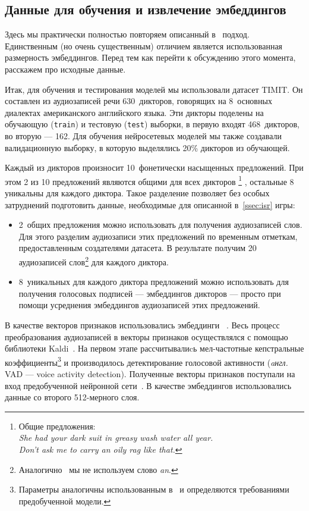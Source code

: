 \subsection{Данные для обучения и извлечение эмбеддингов}\label{ssec:data}

Здесь мы практически полностью повторяем описанный в~\cite{isrpaper} подход.
Единственным (но очень существенным) отличием является использованная размерность
эмбеддингов. Перед тем как перейти к обсуждению этого момента, расскажем про
исходные данные.

Итак, для обучения и тестирования моделей мы использовали датасет
TIMIT\cite{timit}. Он составлен из аудиозаписей речи 630~дикторов, говорящих на
8~основных диалектах американского английского языка. Эти дикторы поделены на
обучающую (\texttt{train}) и тестовую (\texttt{test}) выборки, в первую входят
468~дикторов, во вторую --- 162. Для обучения нейросетевых моделей мы также
создавали валидационную выборку, в которую выделялись 20\% дикторов из обучающей.

Каждый из дикторов произносит 10~фонетически насыщенных предложений. При этом 2
из 10 предложений являются общими для всех дикторов
\footnote{Общие предложения:\\
          \textit{She had your dark suit in greasy wash water all year.}\\
          \textit{Don't ask me to carry an oily rag like that.}}
, остальные 8 уникальны для каждого диктора. Такое разделение позволяет без
особых затруднений подготовить данные, необходимые для описанной
в~\ref{ssec:isr} игры:
\begin{itemize}
    \item 2~общих предложения можно использовать для получения аудиозаписей
    слов.  Для этого разделим аудиозаписи этих предложений по временным
    отметкам, предоставленным создателями датасета. В результате получим 20
    аудиозаписей слов\footnote{Аналогично~\cite{isrpaper} мы не используем слово
    \textit{an}.} для каждого диктора.
    \item 8~уникальных для каждого диктора предложений можно использовать для
    получения голосовых подписей --- эмбеддингов дикторов --- просто при помощи
    усреднения эмбеддингов аудиозаписей этих предложений.
\end{itemize}

В качестве векторов признаков использовались эмбеддинги
\xvector{}~\cite{xvectorspaper}. Весь процесс преобразования аудиозаписей в
векторы признаков осуществлялся с помощью библиотеки Kaldi~\cite{kaldi}. На
первом этапе рассчитывалиcь мел-частотные кепстральные коэффициенты\footnote{
Параметры аналогичны использованным в~\cite{isrpaper} и определяются
требованиями предобученной модели.} и производилось детектирование голосовой
активности (\textit{aнгл.} VAD --- voice activity detection). Полученные векторы
признаков поступали на вход предобученной нейронной сети~\cite{sre16model}. В
качестве эмбеддингов использовались данные со второго 512-мерного слоя.

